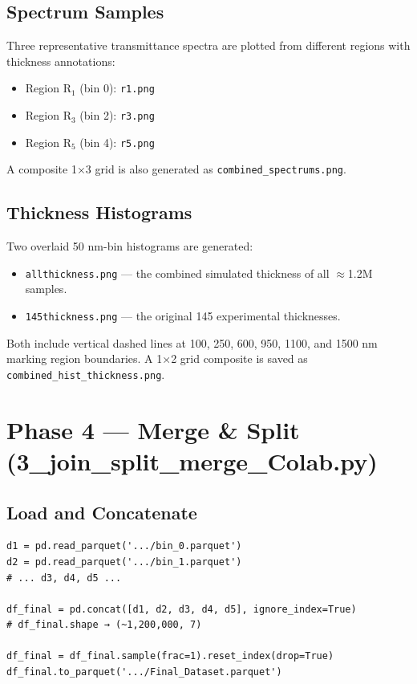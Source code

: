\documentclass[11pt,a4paper]{article}
\begin{document}
\subsection{Spectrum Samples}

Three representative transmittance spectra are plotted from different regions with thickness annotations:
\begin{itemize}
    \item Region R$_1$ (bin 0): {\tt r1.png}
    \item Region R$_3$ (bin 2): {\tt r3.png}
    \item Region R$_5$ (bin 4): {\tt r5.png}
\end{itemize}
A composite 1×3 grid is also generated as {\tt combined\_spectrums.png}.

\subsection{Thickness Histograms}

Two overlaid 50 nm-bin histograms are generated:
\begin{itemize}
    \item {\tt allthickness.png} — the combined simulated thickness of all $\approx$1.2M samples.
    \item {\tt 145thickness.png} — the original 145 experimental thicknesses.
\end{itemize}
Both include vertical dashed lines at 100, 250, 600, 950, 1100, and 1500 nm marking region boundaries. A 1×2 grid composite is saved as {\tt combined\_hist\_thickness.png}.

\section{Phase 4 — Merge \& Split (3\_join\_split\_merge\_Colab.py)}

\subsection{Load and Concatenate}

\begin{lstlisting}
d1 = pd.read_parquet('.../bin_0.parquet')
d2 = pd.read_parquet('.../bin_1.parquet')
# ... d3, d4, d5 ...

df_final = pd.concat([d1, d2, d3, d4, d5], ignore_index=True)
# df_final.shape → (~1,200,000, 7)

df_final = df_final.sample(frac=1).reset_index(drop=True)
df_final.to_parquet('.../Final_Dataset.parquet')
\end{lstlisting}
\end{document}

